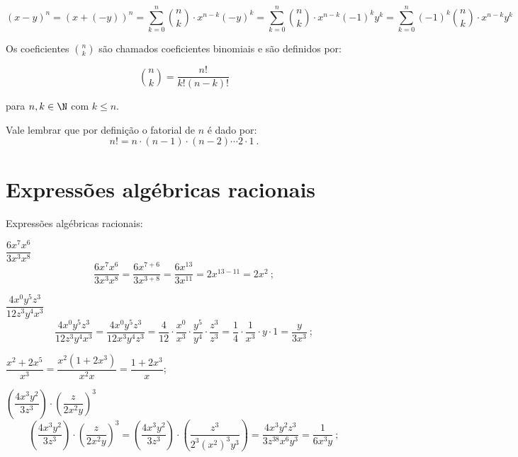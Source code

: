 \begin{equation}
(x - y)^n= (x +(-y))^n= \sum^{n}_{k=0} \binom{n}{k} \cdot x^{n-k} (-y)^{k}= \sum^{n}_{k=0} \binom{n}{k} \cdot x^{n-k} (-1)^{k}y^{k}= \sum^{n}_{k=0} (-1)^{k} \binom{n}{k} \cdot x^{n-k} y^{k}
\end{equation}
 
 Os coeficientes $\binom{n}{k}$ são chamados coeficientes binomiais e são definidos por:
 
\begin{equation}
\binom{n}{k}= \frac{n!}{k!(n-k)!}
\end{equation}

 para $n, k \in \N$ com $k \leq n$. 
 
 Vale lembrar que por definição o fatorial de $n$ é dado por:
\begin{equation}
n!= n \cdot (n-1) \cdot (n-2) \cdots 2 \cdot 1 \ .
\end{equation}

 
 \section{Expressões algébricas racionais}
 
 Expressões algébricas racionais:
 \begin{exem}    
  $\dfrac{6x^7 x^6}{3x^3x^8}$
\begin{equation}
\dfrac{6x^7 x^6}{3x^3x^8}= \dfrac{6x^{7+6}}{3x^{3+8}}= \dfrac{6x^{13}}{3x^{11}}= 2x^{13-11}= 2x^2 \ ;
\end{equation}
 \end{exem}
 
 \begin{exem}
  $\dfrac{4x^0y^5z^3}{12z^3y^4x^3}$
\begin{equation}
\dfrac{4x^0y^5z^3}{12z^3y^4x^3}= \dfrac{4x^0y^5z^3}{12x^3y^4z^3}= \dfrac{4}{12} \cdot \dfrac{x^0}{x^3} \cdot \dfrac{y^5}{y^4} \cdot \dfrac{z^3}{z^3}= \dfrac{1}{4} \cdot \dfrac{1}{x^3} \cdot y \cdot 1=\dfrac{y}{3x^3} \ ;
\end{equation}
  \end{exem}
 
 \begin{exem}
  $\dfrac{x^2+2x^5}{x^3}= \dfrac{x^2(1+2x^3)}{x^2 x}= \dfrac{1+2x^3}{x}$;
 \end{exem}
 
 \begin{exem}
  $\left(\dfrac{4x^3y^2}{3z^3}\right) \cdot \left(\dfrac{z}{2x^2y} \right)^3$
\begin{equation}
\left(\dfrac{4x^3y^2}{3z^3}\right) \cdot \left(\dfrac{z}{2x^2y} \right)^3 = \left(\dfrac{4x^3y^2}{3z^3}\right) \cdot \left(\dfrac{z^3}{2^3(x^2)^3y^3} \right)= \dfrac{4x^3y^2z^3}{3z^38x^6y^3}= \dfrac{1}{6x^3y} \ ;
\end{equation}
  \end{exem}
 
